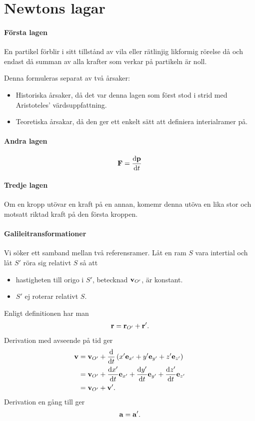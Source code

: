 \section{Newtons lagar}

\paragraph{Första lagen}
En partikel förblir i sitt tillstånd av vila eller rätlinjig likformig rörelse då och endast då summan av alla krafter som verkar på partikeln är noll.

Denna formuleras separat av två årsaker:
\begin{itemize}
	\item Historiska årsaker, då det var denna lagen som först stod i strid med Aristoteles' värdsuppfattning.
	\item Teoretiska årsakar, då den ger ett enkelt sätt att definiera interialramer på.
\end{itemize}

\paragraph{Andra lagen}
\begin{align*}
	\vect{F} = \dv{\vect{p}}{t}
\end{align*}

\paragraph{Tredje lagen}
Om en kropp utövar en kraft på en annan, komemr denna utöva en lika stor och motsatt riktad kraft på den första kroppen.

\paragraph{Galileitransformationer}
Vi söker ett samband mellan två referensramer. Låt en ram $S$ vara intertial och låt $S'$ röra sig relativt $S$ så att
\begin{itemize}
	\item hastigheten till origo i $S'$, betecknad $\vb{v}_{O'}$, är konstant.
	\item $S'$ ej roterar relativt $S$.
\end{itemize}

Enligt definitionen har man
\begin{align*}
	\vb{r} = \vb{r}_{O'} + \vb{r}'.
\end{align*}
Derivation med avseende på tid ger
\begin{align*}
	\vb{v} &= \vb{v}_{O'} + \dv{t}\left(x'\vb{e}_{x'} + y'\vb{e}_{y'} + z'\vb{e}_{z'}\right) \\
	       &= \vb{v}_{O'} + \dv{x'}{t}\vb{e}_{x'} + \dv{y'}{t}\vb{e}_{y'} + \dv{z'}{t}\vb{e}_{z'} \\
	       &= \vb{v}_{O'} + \vb{v}'.
\end{align*}
Derivation en gång till ger
\begin{align*}
	\vb{a} = \vb{a}'.
\end{align*}

